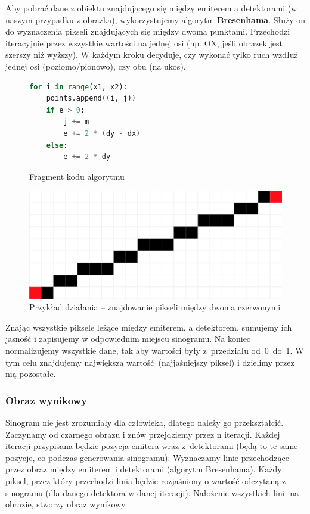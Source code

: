 \documentclass[polish,polish,a4paper]{article}
\begin{document}
				Aby pobrać dane z obiektu znajdującego się między emiterem a detektorami (w naszym przypadku z obrazka), wykorzystujemy algorytm \textbf{Bresenhama}. Służy on do wyznaczenia pikseli znajdujących się między dwoma punktami. Przechodzi iteracyjnie przez wszystkie wartości na jednej osi (np. OX, jeśli obrazek jest szerszy niż wyższy). W każdym kroku decyduje, czy wykonać tylko ruch wzdłuż jednej osi (poziomo/pionowo), czy obu (na ukos).
				
				\begin{figure}[!h]
					\centering
					\begin{minipage}{0.4\linewidth}
						\begin{lstlisting}[language=Python, frame=single]
for i in range(x1, x2):
    points.append((i, j))
    if e > 0:
        j += m
        e += 2 * (dy - dx)
    else:
        e += 2 * dy
						\end{lstlisting}
						\caption{Fragment kodu algorytmu}
					\end{minipage}
					\hfill
					\begin{minipage}{0.45\linewidth}
						\includegraphics[width=\textwidth]{img/bresenham.png}
						\caption{Przykład działania -- znajdowanie pikseli między dwoma czerwonymi}
					\end{minipage}
				\end{figure}
				
				Znając wszystkie piksele leżące między emiterem, a detektorem, 
				sumujemy ich jasność i zapisujemy w odpowiednim miejscu sinogramu.
				Na koniec normalizujemy wszystkie dane, tak aby wartości były z~przedziału od~0~do~1. W tym celu znajdujemy największą wartość (najjaśniejszy piksel) i dzielimy przez nią pozostałe.
				
				\subsubsection{Obraz wynikowy}
				Sinogram nie jest zrozumiały dla człowieka, 
				dlatego należy go przekształcić.
				Zaczynamy od czarnego obrazu i znów przejdziemy przez n iteracji.
				Każdej iteracji przypisana będzie pozycja emitera wraz z~detektorami 
				(będą to te same pozycje, co podczas generowania sinogramu).
				Wyznaczamy linie przechodzące przez obraz między emiterem i detektorami (algorytm Bresenhama).
				Każdy piksel, przez który przechodzi linia będzie rozjaśniony o wartość odczytaną z sinogramu 
				(dla danego detektora w danej iteracji). 
				Nałożenie wszystkich linii na obrazie, stworzy obraz wynikowy.
				
\end{document}
